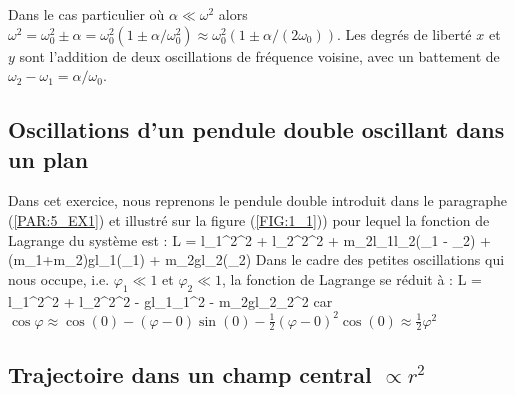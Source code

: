 Dans le cas particulier o\`u $\alpha \ll \omega^{2}$ alors $\omega^{2} = \omega_{0}^{2} \pm \alpha = \omega_{0}^{2}(1 \pm \alpha/\omega_{0}^{2}) \approx \omega_{0}^{2}(1 \pm \alpha/(2\omega_{0}))$. Les degr\'es de libert\'e $x$ et $y$ sont l'addition de deux oscillations de fr\'equence voisine, avec un battement de $\omega_{2} - \omega_{1} = \alpha/\omega_{0}$.

\subsection{Oscillations d'un pendule double oscillant dans un plan}

Dans cet exercice, nous reprenons le pendule double introduit dans le paragraphe (\ref{PAR:5_EX1}) et illustr\'e sur la figure (\ref{FIG:1_1})) pour lequel la fonction de Lagrange du syst\`eme est :
\be
	L = l_{1}^{2}^{2} + l_{2}^{2}^{2} + m_{2}l_{1}l_{2}\cos(\varphi_{1} - \varphi_{2}) + (m_{1}+m_{2})gl_{1}\cos(\varphi_{1}) + m_{2}gl_{2}\cos(\varphi_{2})
\ee
Dans le cadre des petites oscillations qui nous occupe, i.e. $\varphi_{1} \ll 1$ et $\varphi_{2} \ll 1$, la fonction de Lagrange se r\'eduit \`a :
\be
	L = l_{1}^{2}^{2} + l_{2}^{2}^{2} - gl_{1}\varphi_{1}^{2} - m_{2}gl_{2}\varphi_{2}^{2}
\ee
car $\cos\varphi \approx \cos(0) - (\varphi - 0)\sin(0) - \frac{1}{2}(\varphi - 0)^{2}\cos(0) \approx \frac{1}{2}\varphi^{2}$

\subsection{Trajectoire dans un champ central $\propto r^{2}$}\label{PAR:23_EX3}
